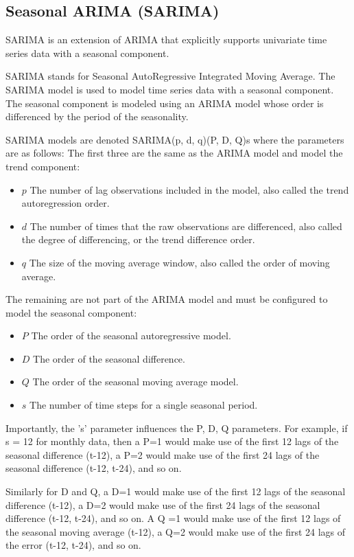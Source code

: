 \documentclass[manuscript,screen,nonacm,11pt]{acmart}
\numberwithin{equation}{section}
\begin{document}
\subsection{Seasonal ARIMA (SARIMA)}
SARIMA is an extension of ARIMA that explicitly supports univariate time series data with a seasonal component.

SARIMA stands for Seasonal AutoRegressive Integrated Moving Average.
The SARIMA model is used to model time series data with a seasonal component. 
The seasonal component is modeled using an ARIMA model whose order is differenced 
by the period of the seasonality.

SARIMA models are denoted SARIMA(p, d, q)(P, D, Q)s where the parameters are as 
follows:
The first three are the same as the ARIMA model and model the trend component:
\begin{itemize}
\item $p$ The number of lag observations included in the model, also 
called the trend autoregression order.
\item $d$ The number of times that the raw observations are differenced, also 
called the degree of differencing, or the trend difference order.
\item $q$ The size of the moving average window, also called the order of moving average.
\end{itemize}

The remaining are not part of the ARIMA model and must be configured to
model the seasonal component:
\begin{itemize}
\item $P$ The order of the seasonal autoregressive model.
\item $D$ The order of the seasonal difference.
\item $Q$ The order of the seasonal moving average model.
\item $s$ The number of time steps for a single seasonal period.
\end{itemize}

Importantly, the 's' parameter influences the P, D, Q parameters. 
For example, if s = 12 for monthly data, then a P=1 would make use of 
the first 12 lags of the seasonal difference (t-12), a P=2 would make 
use of the first 24 lags of the seasonal difference (t-12, t-24), and so on.

Similarly for D and Q, a D=1 would make use of the first 12 lags of 
the seasonal difference (t-12), a D=2 would make use of the first 24
lags of the seasonal difference (t-12, t-24), and so on. 
A Q =1 would make use of the first 12 lags of the seasonal moving 
average (t-12), a Q=2 would make use of the first 24 lags of the error
(t-12, t-24), and so on.
\end{document}
